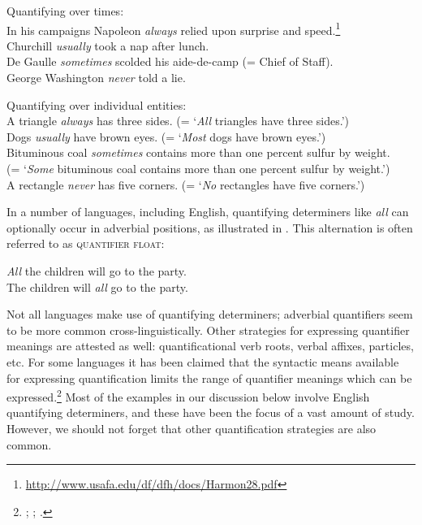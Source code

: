 \ea
Quantifying over times:\\
\ea In his campaigns Napoleon \textit{always} relied upon surprise and speed.\footnote{\url{http://www.usafa.edu/df/dfh/docs/Harmon28.pdf}} \\
\ex Churchill \textit{usually} took a nap after lunch.\\
\ex De Gaulle \textit{sometimes} scolded his aide-de-camp (= Chief of Staff).\\
\ex George Washington \textit{never} told a lie.
                       \z
\z

\ea
Quantifying over individual entities:\\
\ea A triangle \textit{always} has three sides. (= ‘\textit{All} triangles have three sides.’)\\
\ex Dogs \textit{usually} have brown eyes. (= ‘\textit{Most} dogs have brown eyes.’)\\
\ex Bituminous coal \textit{sometimes} contains more than one percent sulfur by weight.\\
  (= ‘\textit{Some} bituminous coal contains more than one percent sulfur by weight.’)\\
\ex A rectangle \textit{never} has five corners. (= ‘\textit{No} rectangles have five corners.’)
                       \z
\z


In a number of languages, including English, quantifying determiners like \textit{all} can optionally occur in adverbial positions, as illustrated in . This alternation is often referred to as \textsc{quantifier float}:


\ea
\ea \textit{All} the children will go to the party.\\
\ex The children will \textit{all} go to the party.
                       \z
\z


Not all languages make use of quantifying determiners; adverbial quantifiers seem to be more common cross-linguistically. Other strategies for expressing quantifier meanings are attested as well: quantificational verb roots, verbal affixes, particles, etc. For some languages it has been claimed that the syntactic means available for expressing quantification limits the range of quantifier meanings which can be expressed.\footnote{\citet{Baker1995}; \citet{Bittner1995}; \citet{KoenigMichelson2010}.} Most of the examples in our discussion below involve English quantifying determiners, and these have been the focus of a vast amount of study. However, we should not forget that other quantification strategies are also common.


